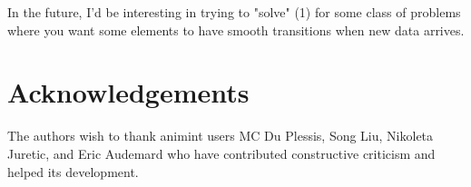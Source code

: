\documentclass[journal]{vgtc}\usepackage[]{graphicx}\usepackage[]{color}
\begin{document}
In the future, I'd be interesting in trying to "solve" (1) for some
class of problems where you want some elements to have smooth
transitions when new data arrives.

\section*{Acknowledgements}

The authors wish to thank animint users MC Du Plessis, Song Liu,
Nikoleta Juretic, and Eric Audemard
who have contributed constructive criticism and helped its development.

%



\end{document}
